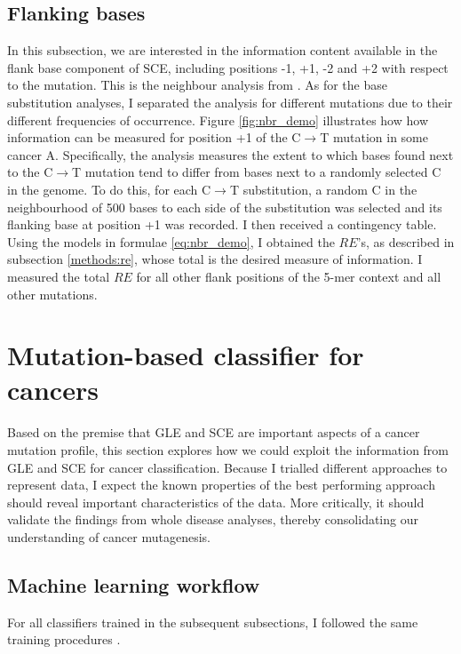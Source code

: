 \subsection{Flanking bases}\label{methods:nbr}
In this subsection, we are interested in the information content available in the flank base component of SCE, including positions -1, +1, -2 and +2 with respect to the mutation. This is the neighbour analysis from \citet{Zhu2017}. As for the base substitution analyses, I separated the analysis for different mutations due to their different frequencies of occurrence. Figure \ref{fig:nbr_demo} illustrates how how information can be measured for position +1 of the C$\rightarrow$T mutation in some cancer A. Specifically, the analysis measures the extent to which bases found next to the C$\rightarrow$T mutation tend to differ from bases next to a randomly selected C in the genome. To do this, for each C$\rightarrow$T substitution, a random C in the neighbourhood of 500 bases to each side of the substitution was selected and its flanking base at position +1 was recorded. I then received a contingency table. Using the models in formulae \ref{eq:nbr_demo}, I obtained the $RE$'s, as described in subsection \ref{methods:re}, whose total is the desired measure of information. I measured the total $RE$ for all other flank positions of the 5-mer context and all other mutations.



\section{Mutation-based classifier for cancers}\label{methods:ml}
Based on the premise that GLE and SCE are important aspects of a cancer mutation profile, this section explores how we could exploit the information from GLE and SCE for cancer classification. Because I trialled different approaches to represent data, I expect the known properties of the best performing approach should reveal important characteristics of the data. More critically, it should validate the findings from whole disease analyses, thereby consolidating our understanding of cancer mutagenesis.

\subsection{Machine learning workflow}\label{methods:ml_workflow}
For all classifiers trained in the subsequent subsections, I followed the same training procedures \citep{Zengyou2015DataApplications}. 

